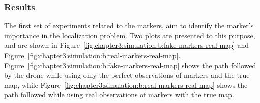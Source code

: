 \subsubsection{Results}
\label{subsubsec:chapter3:simulation:b:results}
The first set of experiments related to the markers, aim to identify the marker's importance in the localization problem. Two plots are presented to this purpose, and are shown in Figure~\ref{fig:chapter3:simulation:b:fake-markers-real-map} and Figure~\ref{fig:chapter3:simulation:b:real-markers-real-map}. Figure~\ref{fig:chapter3:simulation:b:fake-markers-real-map} shows the path followed by the drone while using only the perfect observations of markers and the true map, while Figure~\ref{fig:chapter3:simulation:b:real-markers-real-map} shows the path followed while using real observations of markers with the true map.\\
